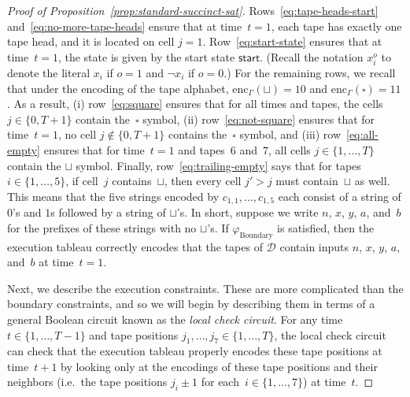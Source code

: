 \documentclass[11pt]{article}
\theoremstyle{definition}
\newcommand{\decider}{\mathcal{D}}
\begin{document}
\begin{proof}[Proof of Proposition~\ref{prop:standard-succinct-sat}]
  Rows~\eqref{eq:tape-heads-start} and~\eqref{eq:no-more-tape-heads} ensure that
  at time~$t = 1$, each tape has exactly one tape head, and it is located on
  cell $j = 1$.
  Row~\eqref{eq:start-state} ensures that at time~$t=1$, the state is given by
  the start state $\mathsf{start}$.
  (Recall the notation $x_i^o$ to denote the literal $x_i$ if $o = 1$ and $\neg
  x_i$ if $o = 0$.)
  For the remaining rows, we recall that under the encoding of the tape
  alphabet, $\mathrm{enc}_\Gamma(\sqcup) = 10$ and $\mathrm{enc}_\Gamma(\square)
  = 11$.
  As a result, (i) row~\eqref{eq:square} ensures that for all times and tapes,
  the cells $j \in \{0, T+1\}$ contain the~$\square$ symbol, (ii)
  row~\eqref{eq:not-square} ensures that for time~$t=1$, no cell $j \notin \{0,
  T+1\}$ contains the~$\square$ symbol, and (iii) row~\eqref{eq:all-empty}
  ensures that for time~$t=1$ and tapes~$6$ and~$7$, all cells $j \in \{1,
  \ldots, T\}$ contain the $\sqcup$ symbol.
  Finally, row~\eqref{eq:trailing-empty} says that for tapes $i \in \{1, \ldots,
  5\}$, if cell~$j$ contains~$\sqcup$, then every cell $j' > j$ must
  contain~$\sqcup$ as well.
  This means that the five strings encoded by $c_{1, 1}, \ldots, c_{1,5}$ each
  consist of a string of $0$'s and $1$s followed by a string of $\sqcup$'s.
  In short, suppose we write $n$, $x$, $y$, $a$, and~$b$ for the prefixes of
  these strings with no $\sqcup$'s.
  If $\varphi_{\mathrm{Boundary}}$ is satisfied, then the execution tableau
  correctly encodes that the tapes of $\decider$ contain inputs $n$, $x$, $y$,
  $a$, and~$b$ at time~$t=1$.

  Next, we describe the execution constraints.
  These are more complicated than the boundary constraints, and so we will begin
  by describing them in terms of a general Boolean circuit known as the
  \emph{local check circuit}.
  For any time~$t\in \{1, \ldots, T-1\}$ and tape positions $j_1, \ldots, j_7
  \in \{1, \ldots, T\}$, the local check circuit can check that the execution
  tableau properly encodes these tape positions at time~$t+1$ by looking only at
  the encodings of these tape positions and their neighbors (i.e.\ the tape
  positions $j_i \pm 1$ for each~$i \in \{1, \ldots, 7\}$) at time~$t$.


\end{proof}
\end{document}
